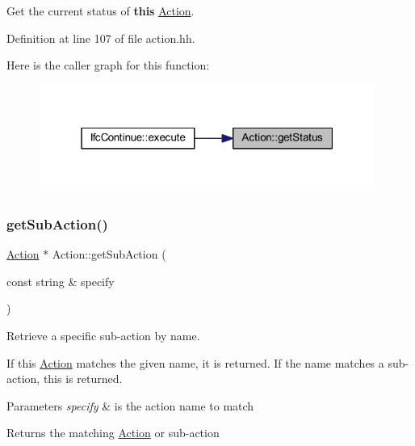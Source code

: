 Get the current status of {\bfseries{this}} \mbox{\hyperlink{class_action}{Action}}. 



Definition at line 107 of file action.\+hh.

Here is the caller graph for this function\+:
\nopagebreak
\begin{figure}[H]
\begin{center}
\leavevmode
\includegraphics[width=313pt]{class_action_a8feb7d10db168e8e92a39d6df995f375_icgraph}
\end{center}
\end{figure}
\mbox{\label{class_action_ad7c260f28ff9705265558c3c077b9792}} 
\subsubsection{\texorpdfstring{getSubAction()}{getSubAction()}}
{\footnotesize\ttfamily \mbox{\hyperlink{class_action}{Action}} $\ast$ Action\+::get\+Sub\+Action (\begin{DoxyParamCaption}\item[{const string \&}]{specify }\end{DoxyParamCaption})\hspace{0.3cm}{\ttfamily [virtual]}}



Retrieve a specific sub-\/action by name. 

If this \mbox{\hyperlink{class_action}{Action}} matches the given name, it is returned. If the name matches a sub-\/action, this is returned. 
\begin{DoxyParams}{Parameters}
{\em specify} & is the action name to match \\
\hline
\end{DoxyParams}
\begin{DoxyReturn}{Returns}
the matching \mbox{\hyperlink{class_action}{Action}} or sub-\/action 
\end{DoxyReturn}


